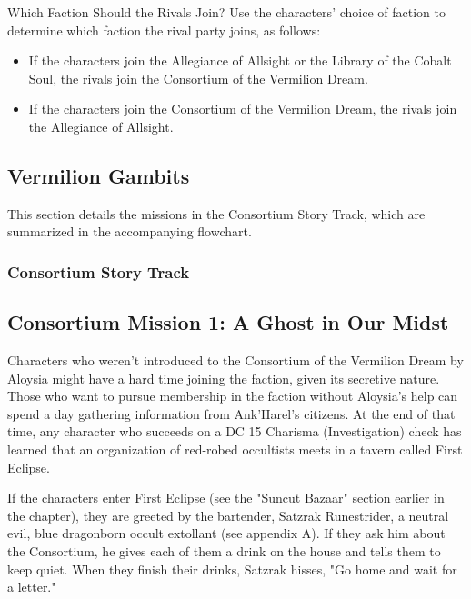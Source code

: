 \documentclass[10pt,a4paper,twoside,twocolumn,openany,nodeprecatedcode]{dndbook}
\begin{document}
\begin{DndSidebar}[float=!b]{Which Faction Should the Rivals Join?}
Use the characters' choice of faction to determine which faction the rival party joins, as follows:




\begin{itemize}
\item If the characters join the Allegiance of Allsight or the Library of the Cobalt Soul, the rivals join the Consortium of the Vermilion Dream.
\item If the characters join the Consortium of the Vermilion Dream, the rivals join the Allegiance of Allsight.
\end{itemize}



\end{DndSidebar}

\subsection{Vermilion Gambits}
This section details the missions in the Consortium Story Track, which are summarized in the accompanying flowchart.

\subsubsection{Consortium Story Track}
\subsection{Consortium Mission 1: A Ghost in Our Midst}
Characters who weren't introduced to the Consortium of the Vermilion Dream by Aloysia might have a hard time joining the faction, given its secretive nature. Those who want to pursue membership in the faction without Aloysia's help can spend a day gathering information from Ank'Harel's citizens. At the end of that time, any character who succeeds on a DC 15 Charisma (Investigation) check has learned that an organization of red-robed occultists meets in a tavern called First Eclipse.

If the characters enter First Eclipse (see the "Suncut Bazaar" section earlier in the chapter), they are greeted by the bartender, Satzrak Runestrider, a neutral evil, blue dragonborn occult extollant (see appendix A). If they ask him about the Consortium, he gives each of them a drink on the house and tells them to keep quiet. When they finish their drinks, Satzrak hisses, "Go home and wait for a letter."
\end{document}
